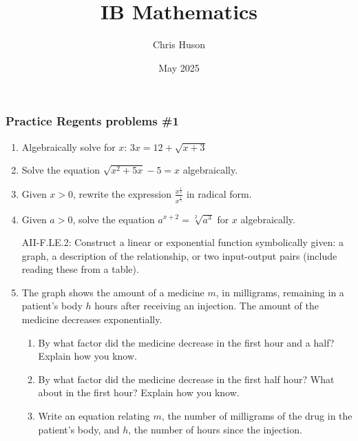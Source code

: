 \documentclass[12pt, twoside]{article}
\title{IB Mathematics}
\author{Chris Huson}
\date{May 2025}
\begin{document}
\subsubsection*{Practice Regents problems \#1}

\begin{enumerate}
\item Algebraically solve for $x$: $3x = 12 + \sqrt{x+3}$
\vspace{9cm}

\item Solve the equation $\sqrt{x^2+5x} - 5 = x$ algebraically.

\newpage

\item Given $x > 0$, rewrite the expression $\displaystyle \frac{x^{\frac{1}{2}}}{x^{\frac{1}{5}}}$ in radical form.
\vspace{9cm}

\item Given $a > 0$, solve the equation $a^{x+2} = \sqrt[2]{a^3}$ for $x$ algebraically. %

\newpage
AII-F.LE.2: Construct a linear or exponential function symbolically given: a graph, a description of the relationship, or two input-output pairs (include reading these from a table).

\item The graph shows the amount of a medicine $m$, in milligrams, remaining in a patient's body $h$ hours after receiving an injection. The amount of the medicine decreases exponentially.
    \begin{center}
    \end{center}
    \begin{enumerate}[itemsep=3cm]
        \item By what factor did the medicine decrease in the first hour and a half? Explain how you know.
        \item By what factor did the medicine decrease in the first half hour? What about in the first hour? Explain how you know. \vspace{1cm}
        \item Write an equation relating $m$, the number of milligrams of the drug in the patient’s body, and $h$, the number of hours since the injection.
    \end{enumerate}

\end{enumerate}
\end{document}
